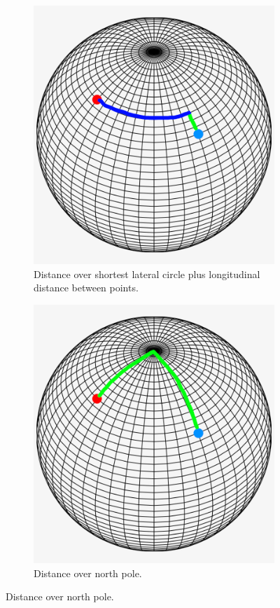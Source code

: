 \documentclass{article}
\begin{document}
\begin{figure}[h]
    \centering
    \begin{subfigure}[t]{0.49\linewidth}
        \centering
        \includegraphics[width=0.7\linewidth]{img1.png}
        \caption*{Distance over shortest lateral circle plus longitudinal distance between points.}
    \end{subfigure}
    \begin{subfigure}[t]{0.49\linewidth}
        \centering
        \includegraphics[width=0.7\linewidth]{img2.png}
        \caption*{Distance over north pole.}
    \end{subfigure}
\end{figure}
\end{document}
